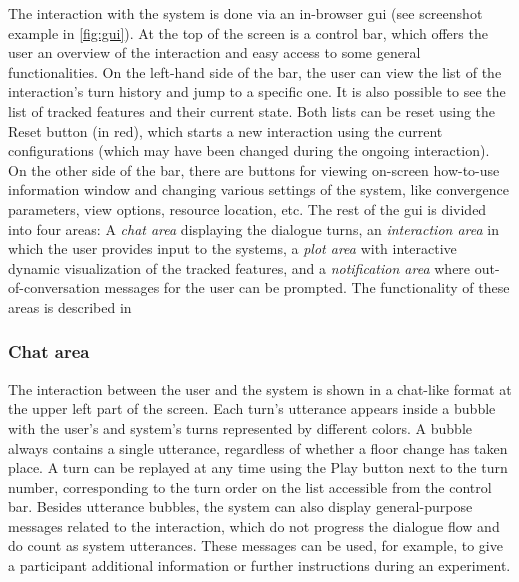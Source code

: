 %
The interaction with the system is done via an in-browser \ac{gui} (see screenshot example in \cref{fig:gui}).
At the top of the screen is a control bar, which offers the user an overview of the interaction and easy access to some general functionalities.
On the left-hand side of the bar, the user can view the list of the interaction's turn history and jump to a specific one.
It is also possible to see the list of tracked features and their current state.
Both lists can be reset using the Reset button (in red), which starts a new interaction using the current configurations (which may have been changed during the ongoing interaction).
On the other side of the bar, there are buttons for viewing on-screen how-to-use information window and changing various settings of the system, like convergence parameters, view options, resource location, etc.
The rest of the \ac{gui} is divided into four areas:
A \emph{chat area} displaying the dialogue turns,
an \emph{interaction area} in which the user provides input to the systems,
a \emph{plot area} with interactive dynamic visualization of the tracked features, and a \emph{notification area} where out-of-conversation messages for the user can be prompted.
The functionality of these areas is described in 

\subsubsection{Chat area}
\label{subsubsec:chat_area}

The interaction between the user and the system is shown in a chat-like format at the upper left part of the screen.
Each turn's utterance appears inside a bubble with the user's and system's turns represented by different colors.
A bubble always contains a single utterance, regardless of whether a floor change has taken place.
A turn can be replayed at any time using the Play button next to the turn number, corresponding to the turn order on the list accessible from the control bar.
Besides utterance bubbles, the system can also display general-purpose messages related to the interaction, which do not progress the dialogue flow and do count as system utterances.
These messages can be used, for example, to give a participant additional information or further instructions during an experiment.

